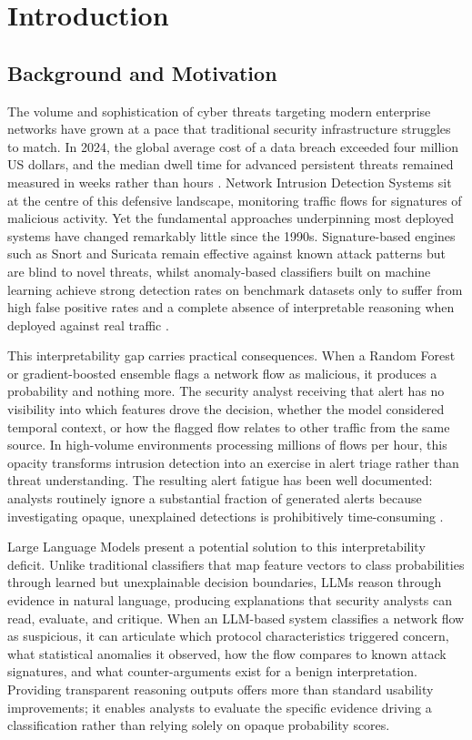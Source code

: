 \documentclass[../main.tex]{subfiles}
\begin{document}
\chapter{Introduction}
\label{ch:introduction}

\section{Background and Motivation}
\label{sec:background-motivation}

The volume and sophistication of cyber threats targeting modern enterprise networks have grown at a pace that traditional security infrastructure struggles to match. In 2024, the global average cost of a data breach exceeded four million US dollars, and the median dwell time for advanced persistent threats remained measured in weeks rather than hours \autocite{IBM2024}. Network Intrusion Detection Systems sit at the centre of this defensive landscape, monitoring traffic flows for signatures of malicious activity. Yet the fundamental approaches underpinning most deployed systems have changed remarkably little since the 1990s. Signature-based engines such as Snort and Suricata remain effective against known attack patterns but are blind to novel threats, whilst anomaly-based classifiers built on machine learning achieve strong detection rates on benchmark datasets only to suffer from high false positive rates and a complete absence of interpretable reasoning when deployed against real traffic \autocite{Hesford2024}.

This interpretability gap carries practical consequences. When a Random Forest or gradient-boosted ensemble flags a network flow as malicious, it produces a probability and nothing more. The security analyst receiving that alert has no visibility into which features drove the decision, whether the model considered temporal context, or how the flagged flow relates to other traffic from the same source. In high-volume environments processing millions of flows per hour, this opacity transforms intrusion detection into an exercise in alert triage rather than threat understanding. The resulting alert fatigue has been well documented: analysts routinely ignore a substantial fraction of generated alerts because investigating opaque, unexplained detections is prohibitively time-consuming \autocite{Alahmadi2020}.

Large Language Models present a potential solution to this interpretability deficit. Unlike traditional classifiers that map feature vectors to class probabilities through learned but unexplainable decision boundaries, LLMs reason through evidence in natural language, producing explanations that security analysts can read, evaluate, and critique. When an LLM-based system classifies a network flow as suspicious, it can articulate which protocol characteristics triggered concern, what statistical anomalies it observed, how the flow compares to known attack signatures, and what counter-arguments exist for a benign interpretation. Providing transparent reasoning outputs offers more than standard usability improvements; it enables analysts to evaluate the specific evidence driving a classification rather than relying solely on opaque probability scores.
\end{document}
